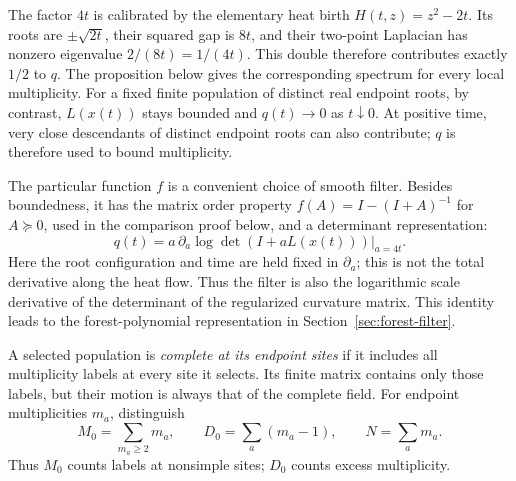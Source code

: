 The factor $4t$ is calibrated by the elementary heat birth
$H(t,z)=z^2-2t$. Its roots are $\pm\sqrt{2t}$, their squared gap is $8t$,
and their two-point Laplacian has nonzero eigenvalue $2/(8t)=1/(4t)$.
This double therefore contributes exactly $1/2$ to $q$.
The proposition below gives the corresponding spectrum for every local
multiplicity. For a fixed finite population of distinct real endpoint
roots, by contrast, $L(x(t))$ stays bounded and $q(t)\to0$ as $t\downarrow0$.
At positive time, very close descendants of distinct endpoint roots can
also contribute; $q$ is therefore used to bound multiplicity.

The particular function $f$ is a convenient choice of smooth filter.
Besides boundedness, it has the matrix order property
$f(A)=I-(I+A)^{-1}$ for $A\succeq0$, used in the comparison proof below,
and a determinant representation:
\begin{equation}
 q(t)=\left.
 a\,\partial_a\log\det\!\left(I+aL(x(t))\right)
 \right|_{a=4t}.
 \label{eq:filter-log-determinant}
\end{equation}
Here the root configuration and time are held fixed in $\partial_a$;
this is not the total derivative along the heat flow.
Thus the filter is also the logarithmic scale derivative of the determinant
of the regularized curvature matrix. This identity leads to the
forest-polynomial representation in Section~\ref{sec:forest-filter}.

A selected population is \emph{complete at its endpoint sites} if it includes
all multiplicity labels at every site it selects. Its finite matrix contains
only those labels, but their motion is always that of the complete field.
For endpoint multiplicities $m_a$, distinguish
\[
 M_0=\sum_{m_a\ge2}m_a,\qquad D_0=\sum_a(m_a-1),\qquad N=\sum_a m_a.
\]
Thus $M_0$ counts labels at nonsimple sites; $D_0$ counts excess multiplicity.

